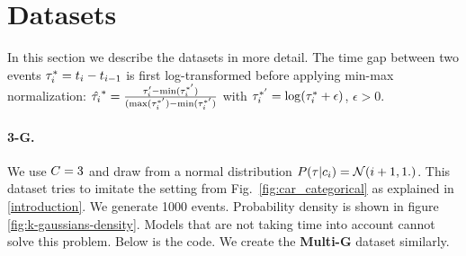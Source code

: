\section{Datasets}\label{datasets}

In this section we describe the datasets in more detail. The time gap between two events $\tau^*_i = t_i - t_{i-1}$ is first log-transformed before applying min-max normalization: $\hat{\tau_i}^* = \frac{\tau_i' - \min(\tau_i^{*'})}{(\max(\tau_i^{*'}) - \min(\tau_i^{*'})}$ with $\tau_i^{*'} = \log(\tau_i^* + \epsilon)$, $\epsilon > 0$.

\paragraph{3-G.} We use $C=3$ and draw from a normal distribution  $P(\tau | c_i) = \mathcal{N}(i + 1, 1.)$. This dataset tries to imitate the setting from Fig.\ \ref{fig:car_categorical} as explained in \ref{introduction}. We generate 1000 events. Probability density is shown in figure \ref{fig:k-gaussians-density}. Models that are not taking time into account cannot solve this problem. Below is the code. We create the \textbf{Multi-G} dataset similarly.\vfill

